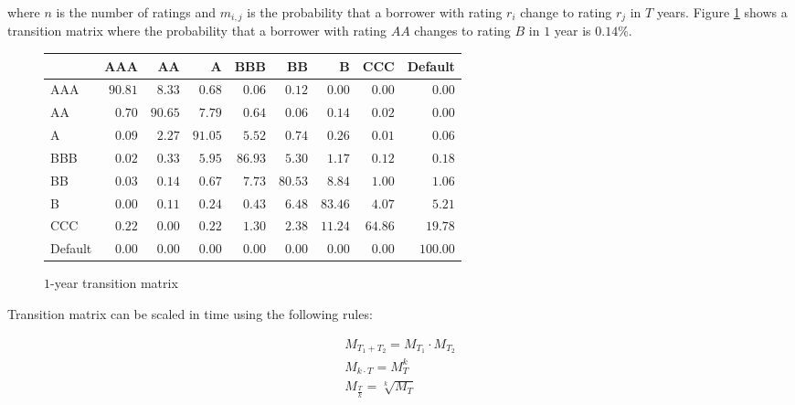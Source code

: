 \documentclass[a4paper,12pt,final]{article}
\begin{document}
where $n$ is the number of ratings and $m_{i,j}$ is the probability that a
borrower with rating $r_i$ change to rating $r_j$ in $T$ years.
Figure \ref{tmatrix1} shows a transition matrix where the probability that 
a borrower with rating $AA$ changes to rating $B$ in $1$ year is $0.14\%$.
\newline

\begin{figure}[!hb]
\begin{center}
\begin{tabular}[]{l|rrrrrrrr}
        &      AAA &       AA &        A &      BBB &       BB &        B &      CCC &  Default \\
\hline
AAA     &  $90.81$ &   $8.33$ &   $0.68$ &   $0.06$ &   $0.12$ &   $0.00$ &   $0.00$ &   $0.00$ \\
 AA     &   $0.70$ &  $90.65$ &   $7.79$ &   $0.64$ &   $0.06$ &   $0.14$ &   $0.02$ &   $0.00$ \\
  A     &   $0.09$ &   $2.27$ &  $91.05$ &   $5.52$ &   $0.74$ &   $0.26$ &   $0.01$ &   $0.06$ \\
BBB     &   $0.02$ &   $0.33$ &   $5.95$ &  $86.93$ &   $5.30$ &   $1.17$ &   $0.12$ &   $0.18$ \\
 BB     &   $0.03$ &   $0.14$ &   $0.67$ &   $7.73$ &  $80.53$ &   $8.84$ &   $1.00$ &   $1.06$ \\
  B     &   $0.00$ &   $0.11$ &   $0.24$ &   $0.43$ &   $6.48$ &  $83.46$ &   $4.07$ &   $5.21$ \\
CCC     &   $0.22$ &   $0.00$ &   $0.22$ &   $1.30$ &   $2.38$ &  $11.24$ &  $64.86$ &  $19.78$ \\
Default &   $0.00$ &   $0.00$ &   $0.00$ &   $0.00$ &   $0.00$ &   $0.00$ &   $0.00$ & $100.00$ \\
\end{tabular}
\caption{$1$-year transition matrix}
\label{tmatrix1}
\end{center}
\end{figure}

Transition matrix can be scaled in time using the following rules:

\begin{equation}
\label{sttm}
\begin{array}{l}
M_{T_1+T_2} = M_{T_1} \cdot M_{T_2} \nonumber \\
M_{k \cdot T} = M_{T}^k \nonumber \\
M_{\frac{T}{k}} = \sqrt[k]{M_{T}} \nonumber
\end{array}
\end{equation}
\end{document}
